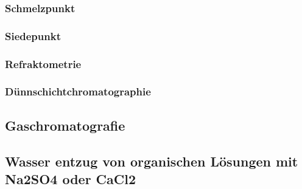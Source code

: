 \subsubsection{Schmelzpunkt}
\subsubsection{Siedepunkt}
\subsubsection{Refraktometrie}
\subsubsection{Dünnschichtchromatographie}

\subsection{Gaschromatografie}
\subsection{Wasser entzug von organischen Lösungen mit Na2SO4 oder CaCl2}